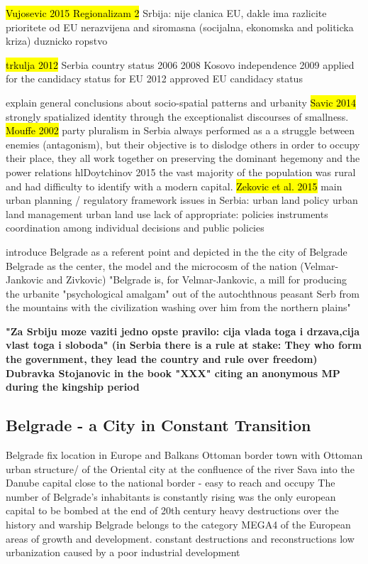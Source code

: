 \documentclass[11pt]{report}
\begin{document}
\hl{Vujosevic 2015 Regionalizam 2}
Srbija:
    nije clanica EU, dakle ima razlicite prioritete od EU
    nerazvijena and siromasna (socijalna, ekonomska and politicka kriza)
    duznicko ropstvo

\hl{trkulja 2012}
Serbia country status 2006
2008 Kosovo independence
2009 applied for the candidacy status for EU
2012 approved EU candidacy status

explain general conclusions about socio-spatial patterns and urbanity
\hl{Savic 2014}
strongly spatialized identity through the exceptionalist discourses of smallness. 
\hl{Mouffe 2002}
party pluralism in Serbia always performed as a a struggle between enemies (antagonism), but their objective is to dislodge others in order to occupy their place, they all work together on preserving the dominant hegemony and the power relations
hl{Doytchinov 2015}
the vast majority of the population was rural and had difficulty to identify with a modern capital.
\hl{Zekovic et al. 2015}
main urban planning / regulatory framework issues in Serbia:
    urban land policy
    urban land management
    urban land use
lack of appropriate:
    policies
    instruments
    coordination among individual decisions and public policies

introduce Belgrade as a referent point
and depicted in the the city of Belgrade
Belgrade as the center, the model and the microcosm of the nation (Velmar-Jankovic and Zivkovic)
"Belgrade is, for Velmar-Jankovic, a mill for producing the urbanite "psychological amalgam" out of the autochthnous peasant Serb from the mountains with the civilization washing over him from the northern plains"

\textbf{"Za Srbiju moze vaziti jedno opste pravilo: cija vlada toga i drzava,cija vlast toga i sloboda" (in Serbia there is a rule at stake: They who form the government, they lead the country and rule over freedom) Dubravka Stojanovic in the book "XXX" citing an anonymous MP during the kingship period}

\subsection{Belgrade - a City in Constant Transition}


Belgrade fix location in Europe and Balkans
Ottoman border town with Ottoman urban structure/ of the Oriental city
at the confluence of the river Sava into the Danube
capital close to the national border - easy to reach and occupy
The number of Belgrade's inhabitants is constantly rising
was the only european capital to be bombed at the end of 20th century
heavy destructions over the history and warship
Belgrade belongs to the category MEGA4 of the European areas of growth and development.
constant destructions and reconstructions
low urbanization caused by a poor industrial development
\end{document}

